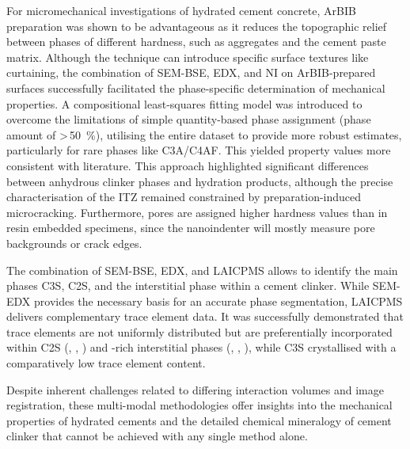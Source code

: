 For micromechanical investigations of hydrated cement concrete, \ac{ArBIB} preparation was shown to be advantageous as it reduces the topographic relief between phases of different hardness, such as aggregates and the cement paste matrix.
Although the technique can introduce specific surface textures like curtaining, the combination of \ac{SEM}-\ac{BSE}, \ac{EDX}, and \ac{NI} on \ac{ArBIB}-prepared surfaces successfully facilitated the phase-specific determination of mechanical properties.
A compositional least-squares fitting model was introduced to overcome the limitations of simple quantity-based phase assignment (phase amount of >\,\qty{50}{\percent}), utilising the entire dataset to provide more robust estimates, particularly for rare phases like \acs{C3A}/\acs{C4AF}. This yielded property values more consistent with literature.
This approach highlighted significant differences between anhydrous clinker phases and hydration products, although the precise characterisation of the \ac{ITZ} remained constrained by preparation-induced microcracking.
Furthermore, pores are assigned higher hardness values than in resin embedded specimens, since the nanoindenter will mostly measure pore backgrounds or crack edges.

The combination of \ac{SEM}-\ac{BSE}, \ac{EDX}, and \ac{LAICPMS} allows to identify the main phases \ac{C3S}, \ac{C2S}, and the interstitial phase within a cement clinker.
While \ac{SEM}-\ac{EDX} provides the necessary basis for an accurate phase segmentation, \ac{LAICPMS} delivers complementary trace element data.
It was successfully demonstrated that trace elements are not uniformly distributed but are preferentially incorporated within \ac{C2S} (, , ) and -rich interstitial phases (, , ), while \ac{C3S} crystallised with a comparatively low trace element content.

Despite inherent challenges related to differing interaction volumes and image registration, these multi-modal methodologies offer insights into the mechanical properties of hydrated cements and the detailed chemical mineralogy of cement clinker that cannot be achieved with any single method alone.
